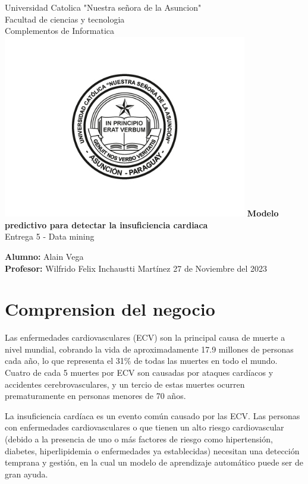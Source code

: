 \documentclass[12pt, letterpaper]{article}
\begin{document}
\begin{titlepage}
  \begin{center}
      \Large{Universidad Catolica "Nuestra señora de la Asuncion" \\
      Facultad de ciencias y tecnologia \\
      Complementos de Informatica}
      \includegraphics[width=0.8\textwidth]{UcaLogo.jpg}
      \LARGE{\textbf{Modelo predictivo para detectar la insuficiencia cardiaca
      }} \\
      \Large{Entrega 5 - Data mining}
      \vspace{1cm}
  \end{center}
      \large
      \textbf{Alumno: }Alain Vega \\
      \textbf{Profesor: }Wilfrido Felix Inchaustti Martínez
      \vfill
      \hfill{27 de Noviembre del 2023}
\end{titlepage}


\newpage
\tableofcontents %
\newpage

\section{Comprension del negocio}
Las enfermedades cardiovasculares (ECV) son la principal causa de muerte a nivel mundial, 
cobrando la vida de aproximadamente 17.9 millones de personas cada año, 
lo que representa el 31\% de todas las muertes en todo el mundo. 
Cuatro de cada 5 muertes por ECV son causadas por ataques cardíacos y accidentes cerebrovasculares, 
y un tercio de estas muertes ocurren prematuramente en personas menores de 70 años. 

La insuficiencia cardíaca es un evento común causado por las ECV.
Las personas con enfermedades cardiovasculares o que tienen un alto riesgo cardiovascular 
(debido a la presencia de uno o más factores de riesgo como hipertensión, diabetes, 
hiperlipidemia o enfermedades ya establecidas) necesitan una detección temprana y gestión, 
en la cual un modelo de aprendizaje automático puede ser de gran ayuda. 
\cite*{dataset}
\end{document}
